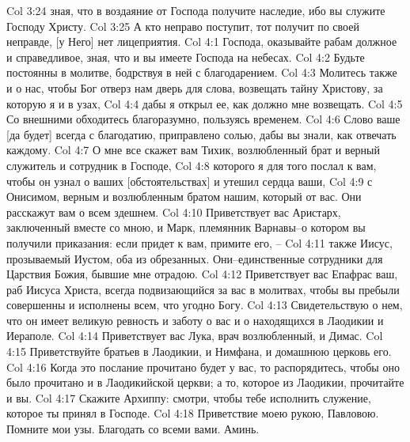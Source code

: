 Col 3:24  зная, что в воздаяние от Господа получите наследие, ибо вы служите Господу Христу.
Col 3:25  А кто неправо поступит, тот получит по своей неправде, [у Него] нет лицеприятия.
Col 4:1  Господа, оказывайте рабам должное и справедливое, зная, что и вы имеете Господа на небесах.
Col 4:2  Будьте постоянны в молитве, бодрствуя в ней с благодарением.
Col 4:3  Молитесь также и о нас, чтобы Бог отверз нам дверь для слова, возвещать тайну Христову, за которую я и в узах,
Col 4:4  дабы я открыл ее, как должно мне возвещать.
Col 4:5  Со внешними обходитесь благоразумно, пользуясь временем.
Col 4:6  Слово ваше [да будет] всегда с благодатию, приправлено солью, дабы вы знали, как отвечать каждому.
Col 4:7  О мне все скажет вам Тихик, возлюбленный брат и верный служитель и сотрудник в Господе,
Col 4:8  которого я для того послал к вам, чтобы он узнал о ваших [обстоятельствах] и утешил сердца ваши,
Col 4:9  с Онисимом, верным и возлюбленным братом нашим, который от вас. Они расскажут вам о всем здешнем.
Col 4:10  Приветствует вас Аристарх, заключенный вместе со мною, и Марк, племянник Варнавы--о котором вы получили приказания: если придет к вам, примите его, --
Col 4:11  также Иисус, прозываемый Иустом, оба из обрезанных. Они--единственные сотрудники для Царствия Божия, бывшие мне отрадою.
Col 4:12  Приветствует вас Епафрас ваш, раб Иисуса Христа, всегда подвизающийся за вас в молитвах, чтобы вы пребыли совершенны и исполнены всем, что угодно Богу.
Col 4:13  Свидетельствую о нем, что он имеет великую ревность и заботу о вас и о находящихся в Лаодикии и Иераполе.
Col 4:14  Приветствует вас Лука, врач возлюбленный, и Димас.
Col 4:15  Приветствуйте братьев в Лаодикии, и Нимфана, и домашнюю церковь его.
Col 4:16  Когда это послание прочитано будет у вас, то распорядитесь, чтобы оно было прочитано и в Лаодикийской церкви; а то, которое из Лаодикии, прочитайте и вы.
Col 4:17  Скажите Архиппу: смотри, чтобы тебе исполнить служение, которое ты принял в Господе.
Col 4:18  Приветствие моею рукою, Павловою. Помните мои узы. Благодать со всеми вами. Аминь.


